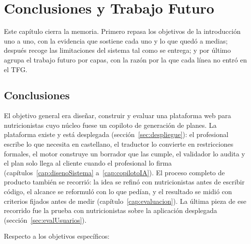 \chapter{Conclusiones y Trabajo Futuro}
\label{cap:conclusiones}

Este capítulo cierra la memoria. Primero repasa los objetivos de la introducción uno a uno, con la evidencia que sostiene cada uno y lo que quedó a medias; después recoge las limitaciones del sistema tal como se entrega; y por último agrupa el trabajo futuro por capas, con la razón por la que cada línea no entró en el TFG.

\section{Conclusiones}
\label{sec:conclusionesObjetivos}

El objetivo general era diseñar, construir y evaluar una plataforma web para nutricionistas cuyo núcleo fuese un copiloto de generación de planes. La plataforma existe y está desplegada (sección~\ref{sec:despliegue}): el profesional escribe lo que necesita en castellano, el traductor lo convierte en restricciones formales, el motor construye un borrador que las cumple, el validador lo audita y el plan solo llega al cliente cuando el profesional lo firma (capítulos~\ref{cap:disenoSistema} a~\ref{cap:copilotoIA}). El proceso completo de producto también se recorrió: la idea se refinó con nutricionistas antes de escribir código, el alcance se reformuló con lo que pedían, y el resultado se midió con criterios fijados antes de medir (capítulo~\ref{cap:evaluacion}). La última pieza de ese recorrido fue la prueba con nutricionistas sobre la aplicación desplegada (sección~\ref{sec:evalUsuarios}).

Respecto a los objetivos específicos:

